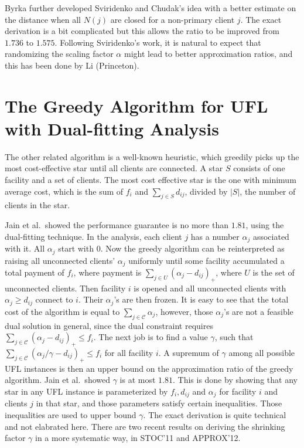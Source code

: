 \documentclass{article}[11pt]
\newcommand{\cli}{\mathcal{C}}
\newcommand{\etal}{et al.\ }
\begin{document}
Byrka further developed Sviridenko and Chudak's idea with a better
estimate on the distance when all $N(j)$ are closed for a non-primary
client $j$. The exact derivation is a bit complicated but this allows
the ratio to be improved from $1.736$ to $1.575$. Following
Sviridenko's work, it is natural to expect that randomizing the
scaling factor $\alpha$ might lead to better approximation ratios, and
this has been done by Li (Princeton).

\section{The Greedy Algorithm for UFL with Dual-fitting Analysis}
The other related algorithm is a well-known heuristic, which greedily
picks up the most cost-effective star until all clients are
connected. A star $S$ consists of one facility and a set of
clients. The most cost effective star is the one with minimum average
cost, which is the sum of $f_i$ and $\sum_{j\in S} d_{ij}$, divided by
$|S|$, the number of clients in the star. 

Jain \etal showed the performance guarantee is no more than $1.81$,
using the dual-fitting technique. In the analysis, each client $j$ has
a number $\alpha_j$ associated with it. All $\alpha_j$ start with
$0$. Now the greedy algorithm can be reinterpreted as raising all
unconnected clients' $\alpha_j$ uniformly until some facility
accumulated a total payment of $f_i$, where payment is $\sum_{j\in U}
(\alpha_j - d_{ij})_+$, where $U$ is the set of unconnected
clients. Then facility $i$ is opened and all unconnected clients with
$\alpha_j \geq d_{ij}$ connect to $i$. Their $\alpha_j$'s are then
frozen. It is easy to see that the total cost of the algorithm is
equal to $\sum_{j\in\cli} \alpha_j$, however, those $\alpha_j$'s are
not a feasible dual solution in general, since the dual constraint
requires $\sum_{j\in \cli} (\alpha_j - d_{ij})_+ \leq f_i$. The next
job is to find a value $\gamma$, such that $\sum_{j\in \cli} (\alpha_j
/ \gamma - d_{ij})_+ \leq f_i$ for all facility $i$. A supremum of
$\gamma$ among all possible UFL instances is then an upper bound on
the approximation ratio of the greedy algorithm. Jain \etal showed
$\gamma$ is at most $1.81$. This is done by showing that any star in
any UFL instance is parameterized by $f_i, d_{ij}$ and $\alpha_j$ for
facility $i$ and clients $j$ in that star, and those parameters
satisfy certain inequalities. Those inequalities are used to upper
bound $\gamma$. The exact derivation is quite technical and not
elabrated here. There are two recent results on deriving the shrinking
factor $\gamma$ in a more systematic way, in STOC'11 and APPROX'12.
\end{document}
